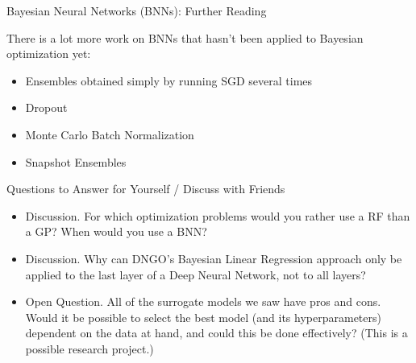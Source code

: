 \begin{frame}[c]{Bayesian Neural Networks (BNNs): Further Reading}

There is a lot more work on BNNs that hasn't been applied to Bayesian optimization yet:
\begin{itemize}
        \item Ensembles obtained simply by running SGD several times 
        \item Dropout  
        \item Monte Carlo Batch Normalization  %
        \item Snapshot Ensembles  
\end{itemize}


\end{frame}
\begin{frame}[c]{Questions to Answer for Yourself / Discuss with Friends}

\begin{itemize}
    \item \alert{Discussion.} For which optimization problems would you rather use a RF than a GP? When would you use a BNN?
\medskip
    \item \alert{Discussion.} Why can DNGO's Bayesian Linear Regression approach only be applied to the last layer of a Deep Neural Network, not to all layers?
\medskip    
    \item \alert{Open Question.} All of the surrogate models we saw have pros and cons. Would it be possible to select the best model (and its hyperparameters) dependent on the data at hand, and could this be done effectively? (This is a possible research project.)

\end{itemize}
\end{frame}
